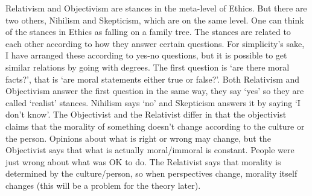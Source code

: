 Relativism and Objectivism are stances in the meta-level of Ethics. But there are two others, Nihilism and Skepticism, which are on the same level. One can think of the stances in Ethics as falling on a family tree. The stances are related to each other according to how they answer certain questions. For simplicity's sake, I have arranged these according to yes-no questions, but it is possible to get similar relations by going with degrees. The first question is `are there moral facts?', that is `are moral statements either true or false?'. Both Relativism and Objectivism answer the first question in the same way, they say `yes' so they are called `realist' stances. Nihilism says `no' and Skepticism answers it by saying `I don't know'. The Objectivist and the Relativist differ in that the objectivist claims that the morality of something doesn't change according to the culture or the person. Opinions about what is right or wrong may change, but the Objectivist says that what is actually moral/immoral is constant. People were just wrong about what was OK to do. The Relativist says that morality is determined by the culture/person, so when perspectives change, morality itself changes (this will be a problem for the theory later). 

\begin{center}
\end{center}


